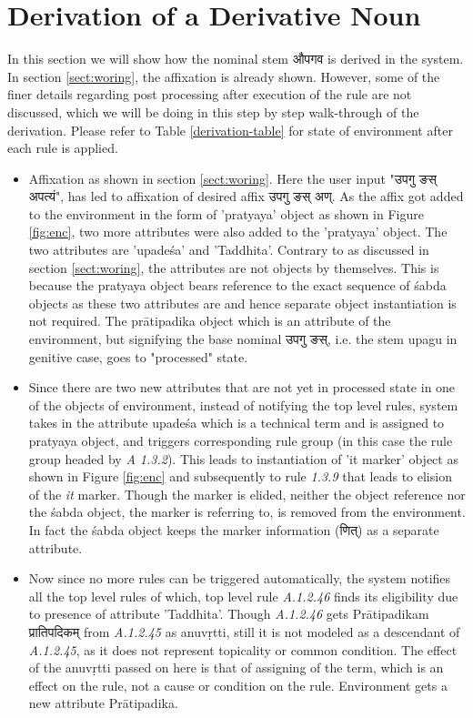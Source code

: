 \documentclass[a4paper,11pt,twoside,openright]{report}
\begin{document}
\section{Derivation of a Derivative Noun}
\label{sect:egderi}
In this section we will show how the nominal stem {\skt औपगव} is derived in the system.
In section \ref{sect:woring}, the affixation is already shown. However, some of the finer details regarding post processing after execution of the rule are not discussed, which we will be doing in this step by step walk-through of the derivation. Please refer to Table \ref{derivation-table} for state of environment after each rule is applied.
\begin{itemize}
\item  Affixation as shown in section \ref{sect:woring}. Here the user input "{\skt उपगु ङस् अपत्यं}", has led to affixation of desired affix {\skt उपगु ङस् अण्}. As the affix got added to the environment in the form of 'pratyaya' object as shown in Figure \ref{fig:enc}, two more attributes were also added to the 'pratyaya' object. The two attributes are 'upadeśa' and 'Taddhita'. Contrary to as discussed in section \ref{sect:woring}, the attributes are not objects by themselves. This is because the pratyaya object bears reference to the exact sequence of śabda objects as these two attributes are and hence separate object instantiation is not required. The prātipadika object which is an attribute of the environment, but signifying the base nominal {\skt उपगु ङस्}, i.e. the stem upagu in genitive case,  goes to "processed" state. 

\item Since there are two new attributes that are not yet in processed state in one of the objects of environment, instead of notifying the top level rules, system takes in the attribute upadeśa which is a technical term and is assigned to pratyaya object,  and triggers corresponding rule group (in this case the rule group headed by \textsl{ A 1.3.2}). This leads to instantiation of 'it marker' object as shown in Figure \ref{fig:enc} and subsequently to rule \textsl{ 1.3.9} that leads to elision of the \textsl{ it} marker. Though the marker is elided, neither the object reference nor the śabda object, the marker is referring to, is removed from the environment. In fact the śabda object keeps the marker information ({\skt णित्}) as a separate attribute.

\item Now since no more rules can be triggered automatically, the system notifies all the top level rules of which, top level rule \textsl{ A.1.2.46} finds its eligibility due to presence of attribute 'Taddhita'. Though \textsl{ A.1.2.46} gets Prātipadikam { \skt प्रातिपदिकम्  } from \textsl{ A.1.2.45} as anuvṛtti, still it is not modeled as a descendant of \textsl{ A.1.2.45}, as it does not represent topicality or common condition. The effect of the anuvṛtti passed on here is that of assigning of the term, which is an effect on the rule, not a cause or condition on the rule. Environment gets a new attribute Prātipadika.


\end{itemize}
\end{document}
